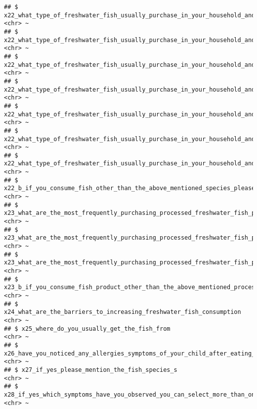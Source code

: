 \documentclass[
]{article}
\begin{document}
\begin{verbatim}
## $ x22_what_type_of_freshwater_fish_usually_purchase_in_your_household_and_how_much_per_month_aandha                                            <chr> ~
## $ x22_what_type_of_freshwater_fish_usually_purchase_in_your_household_and_how_much_per_month_kawayya                                           <chr> ~
## $ x22_what_type_of_freshwater_fish_usually_purchase_in_your_household_and_how_much_per_month_ankutta                                           <chr> ~
## $ x22_what_type_of_freshwater_fish_usually_purchase_in_your_household_and_how_much_per_month_magura                                            <chr> ~
## $ x22_what_type_of_freshwater_fish_usually_purchase_in_your_household_and_how_much_per_month_karadu_issa                                       <chr> ~
## $ x22_what_type_of_freshwater_fish_usually_purchase_in_your_household_and_how_much_per_month_carp_spp                                          <chr> ~
## $ x22_what_type_of_freshwater_fish_usually_purchase_in_your_household_and_how_much_per_month_other                                             <chr> ~
## $ x22_b_if_you_consume_fish_other_than_the_above_mentioned_species_please_mention_it_here                                                      <chr> ~
## $ x23_what_are_the_most_frequently_purchasing_processed_freshwater_fish_products_in_your_household_per_month_dried_fish                        <chr> ~
## $ x23_what_are_the_most_frequently_purchasing_processed_freshwater_fish_products_in_your_household_per_month_smoked_fish                       <chr> ~
## $ x23_what_are_the_most_frequently_purchasing_processed_freshwater_fish_products_in_your_household_per_month_other                             <chr> ~
## $ x23_b_if_you_consume_fish_product_other_than_the_above_mentioned_processed_product_please_mention_it_here                                    <chr> ~
## $ x24_what_are_the_barriers_to_increasing_freshwater_fish_consumption                                                                          <chr> ~
## $ x25_where_do_you_usually_get_the_fish_from                                                                                                   <chr> ~
## $ x26_have_you_noticed_any_allergies_symptoms_of_your_child_after_eating_freshwater_fish                                                       <chr> ~
## $ x27_if_yes_please_mention_the_fish_species_s                                                                                                 <chr> ~
## $ x28_if_yes_which_symptoms_have_you_observed_you_can_select_more_than_one_option                                                              <chr> ~
\end{verbatim}
\end{document}
